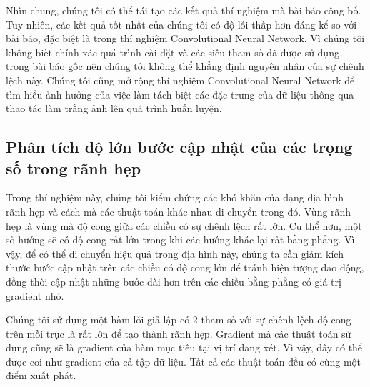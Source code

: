 Nhìn chung, chúng tôi có thể tái tạo các kết quả thí nghiệm mà bài báo công bố. Tuy nhiên, các kết quả tốt nhất của chúng tôi có độ lỗi thấp hơn đáng kể so với bài báo, đặc biệt là trong thí nghiệm Convolutional Neural Network. Vì chúng tôi không biết chính xác quá trình cài đặt và các siêu tham số đã được sử dụng trong bài báo gốc nên chúng tôi không thể khẳng định nguyên nhân của sự chênh lệch này. Chúng tôi cũng mở rộng thí nghiệm Convolutional Neural Network để tìm hiểu ảnh hưởng của việc làm tách biệt các đặc trưng của dữ liệu thông qua thao tác làm trắng ảnh lên quá trình huấn luyện.

\subsection{Phân tích độ lớn bước cập nhật của các trọng số trong rãnh hẹp}

Trong thí nghiệm này, chúng tôi kiểm chứng các khó khăn của dạng địa hình rãnh hẹp và cách mà các thuật toán khác nhau di chuyển trong đó. Vùng rãnh hẹp là vùng mà độ cong giữa các chiều có sự chênh lệch rất lớn. Cụ thể hơn, một số hướng sẽ có độ cong rất lớn trong khi các hướng khác lại rất bằng phẳng. Vì vậy, để có thể di chuyển hiệu quả trong địa hình này, chúng ta cần giảm kích thước bước cập nhật trên các chiều có độ cong lớn để tránh hiện tượng dao động, đồng thời cập nhật những bước dài hơn trên các chiều bằng phẳng có giá trị gradient nhỏ.

Chúng tôi sử dụng một hàm lỗi giả lập có 2 tham số với sự chênh lệch độ cong trên mỗi trục là rất lớn để tạo thành rãnh hẹp. Gradient mà các thuật toán sử dụng cũng sẽ là gradient của hàm mục tiêu tại vị trí đang xét. Vì vậy, đây có thể được coi như gradient của cả tập dữ liệu. Tất cả các thuật toán đều có cùng một điểm xuất phát.

